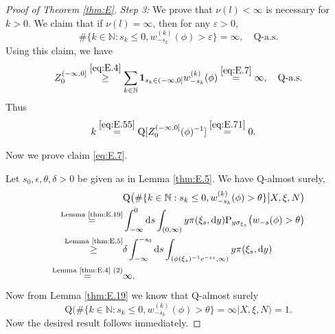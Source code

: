 \documentclass[12pt,a4paper]{amsart}
\numberwithin{equation}{section}
\theoremstyle{plain}
\theoremstyle{definition}
\theoremstyle{remark}
\begin{document}
\begin{proof}[Proof of Theorem \ref{thm:E}]
\emph{Step 3:} We prove that $\nu(l)<\infty$ is necessary for $k>0$.
	We claim that if $\nu(l) = \infty$, then for any $\varepsilon>0$, 
\begin{equation} \label{eq:E.7}
	\#\{k\in \mathbb N: s_k\leq 0, w_{-s_k}^{(k)}(\phi)> \varepsilon\} =\infty,
	\quad \mathrm Q\text{-a.s.}
\end{equation}
Using this claim, we have
\begin{equation} \label{eq:E.71}
	Z_0^{(-\infty, 0]} \overset{\eqref{eq:E.4}}\geq 
	\sum_{k\in \mathbb N} 	
	\mathbf 1_{s_k \in (-\infty, 0]}  w^{(k)}_{-s_k}(\phi)
	\overset{\eqref{eq:E.7}}= \infty,
		\quad \mathrm Q\text{-a.s.}
	\end{equation}
	Thus
\begin{align}
	& k \overset{\eqref{eq:E.55}}= \mathrm Q[Z^{(-\infty,0]}_0(\phi)^{-1}]
		\overset{\eqref{eq:E.71}}= 0.
\end{align}

Now we prove claim \eqref{eq:E.7}.
\begin{comment}
	Note that
	\begin{equation} \label{eq:E.72}
	\begin{minipage}{0.9\textwidth}
	if $\{Z; \mathrm P\}$ is a non-negative random variable such that there exists a $\sigma$-field $\mathscr H$ with $\mathrm P\big(\mathrm P[Z=\infty|\mathscr H] =1\big) = 1$, then $\mathrm P(Z = \infty) = 1$.
	\end{minipage}
	\end{equation}
	In fact,
	\[
	\mathrm P(Z = \infty)
	= \mathrm P\big(P(Z = \infty|\mathscr H)\big)
	= 1.
	\]
\end{comment}
%	
Let $s_0, \epsilon, \theta, \delta > 0$ be given as in Lemma \ref{thm:E.5}.
	We have $\mathrm Q$-almost surely,
\begin{align}
	  &\mathrm Q\big(\#\{k\in \mathbb N:s_k\leq 0, w_{-s_k}^{(k)}(\phi)> \theta\} \big| X, \xi, N\big) 
	\\\overset{\text{Lemma \ref{thm:E.19}}}= &\int_{-\infty}^0 \mathrm ds \int_{(0,\infty)}  y \pi(\xi_s, \mathrm dy) \mathrm P_{y \sigma_{\xi_s}}\big(w_{-s}(\phi)>\theta\big)
	\\\overset{\text{Lemma \ref{thm:E.5}}}\geq &\delta \int_{-\infty}^{-s_0} \mathrm ds
 \int_{(\phi(\xi_s)^{-1}e^{-\epsilon s},\infty)}  y \pi(\xi_s, \mathrm dy)
  	\\  \overset{\text{Lemma \ref{thm:E.4} (2)}}=& \infty.
\end{align}
	Now from Lemma \ref{thm:E.19} we know that $\mathrm Q$-almost surely
\begin{equation} \label{eq:E.9}
	\mathrm Q \big(\#\{k\in \mathbb N:s_k\leq 0, w_{-s_k}^{(k)}(\phi)> \theta\} = \infty\big| X, \xi, N\big)  = 1.
\end{equation}
Now the desired result follows immediately.
\end{proof}
\end{document}
